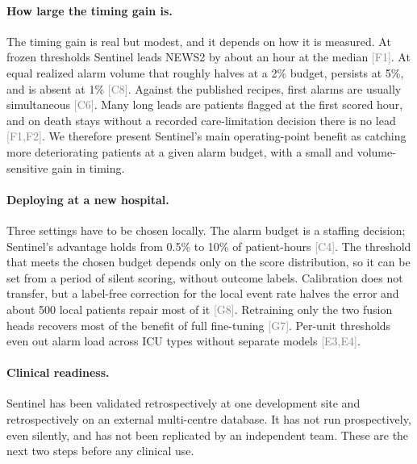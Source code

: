 \documentclass[11pt]{article}
\newcommand{\ev}[1]{\textcolor{gray}{\scriptsize[#1]}}   %
\begin{document}
\paragraph{How large the timing gain is.}
The timing gain is real but modest, and it depends on how it is measured. At
frozen thresholds Sentinel leads NEWS2 by about an hour at the median
\ev{F1}. At equal realized alarm volume that roughly halves at a 2\% budget,
persists at 5\%, and is absent at 1\% \ev{C8}. Against the published recipes,
first alarms are usually simultaneous \ev{C6}. Many long leads are patients
flagged at the first scored hour, and on death stays without a recorded
care-limitation decision there is no lead \ev{F1,F2}. We therefore present
Sentinel's main operating-point benefit as catching more deteriorating patients
at a given alarm budget, with a small and volume-sensitive gain in timing.

\paragraph{Deploying at a new hospital.}
Three settings have to be chosen locally. The alarm budget is a staffing
decision; Sentinel's advantage holds from 0.5\% to 10\% of patient-hours
\ev{C4}. The threshold that meets the chosen budget depends only on the score
distribution, so it can be set from a period of silent scoring, without
outcome labels. Calibration does not transfer, but a label-free correction for
the local event rate halves the error and about 500 local patients repair most of
it \ev{G8}. Retraining only the two fusion heads recovers most of the benefit of
full fine-tuning \ev{G7}. Per-unit thresholds even out alarm load across ICU types
without separate models \ev{E3,E4}.

\paragraph{Clinical readiness.}
Sentinel has been validated retrospectively at one development site and
retrospectively on an external multi-centre database. It has not run
prospectively, even silently, and has not been replicated by an independent
team. These are the next two steps before any clinical use.
\end{document}
